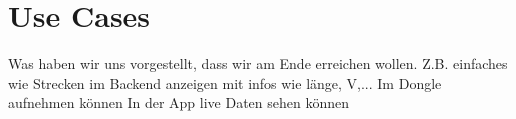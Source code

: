 \chapter{Use Cases}
\label{sec:useCases}

Was haben wir uns vorgestellt, dass wir am Ende erreichen wollen. 
Z.B. einfaches wie Strecken im Backend anzeigen mit infos wie länge, V,...
Im Dongle aufnehmen können
In der App live Daten sehen können

  

 
 
 
 
 
 
 
 
